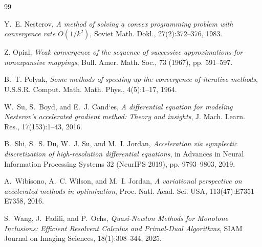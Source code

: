 \documentclass[11pt]{article}
\numberwithin{equation}{section}
\begin{document}
\begin{thebibliography}{99}

Y.~E. Nesterov, \textit{A method of solving a convex programming problem with convergence rate $O(1/k^2)$}, Soviet Math. Dokl., 27(2):372--376, 1983.

 Z. Opial, \textit{Weak convergence of the sequence of successive approximations for nonexpansive mappings}, Bull. Amer. Math. Soc., 73 (1967), pp. 591–597.

B.~T. Polyak, \textit{Some methods of speeding up the convergence of iterative methods}, U.S.S.R. Comput. Math. Math. Phys., 4(5):1--17, 1964.



W.~Su, S.~Boyd, and E.~J. Cand`{e}s, \textit{A differential equation for modeling Nesterov’s accelerated gradient method: Theory and insights}, J. Mach. Learn. Res., 17(153):1--43, 2016.

B.~Shi, S.~S. Du, W.~J. Su, and M.~I. Jordan, \textit{Acceleration via symplectic discretization of high-resolution differential equations}, in Advances in Neural Information Processing Systems 32 (NeurIPS 2019), pp. 9793--9803, 2019.

A.~Wibisono, A.~C. Wilson, and M.~I. Jordan, \textit{A variational perspective on accelerated methods in optimization}, Proc. Natl. Acad. Sci. USA, 113(47):E7351--E7358, 2016.


S.~Wang, J.~Fadili, and P.~Ochs,
\textit{Quasi-Newton Methods for Monotone Inclusions: Efficient Resolvent Calculus and Primal-Dual Algorithms},
SIAM Journal on Imaging Sciences, 18(1):308--344, 2025.
\end{thebibliography}
\end{document}
